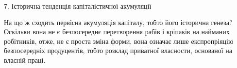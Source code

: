 7. Історична тенденція капіталістичної акумуляції

На що ж сходить первісна акумуляція капіталу, тобто його
історична генеза? Оскільки вона не є безпосереднє перетворення
рабів і кріпаків на найманих робітників, отже, не є проста
зміна форми, вона означає лише експропріяцію безпосередніх
продуцентів, тобто розклад приватної власности, основаної на
власній праці.
